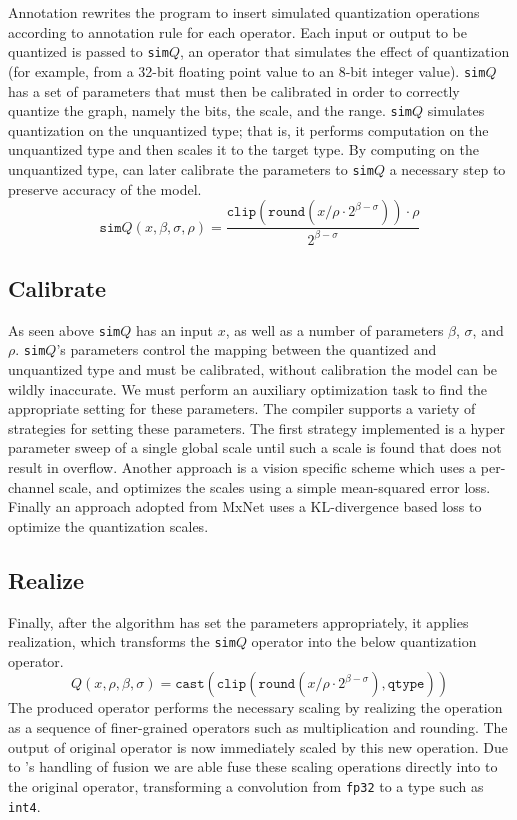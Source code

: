 Annotation rewrites the program to insert simulated quantization operations
  according to annotation rule for each operator.
Each input or output to be quantized is passed to \texttt{sim$Q$},
  an operator that simulates the effect of quantization (for example, from a 32-bit
  floating point value to an 8-bit integer value).
\texttt{sim$Q$} has a set of parameters that must then be calibrated in order to
  correctly quantize the graph, namely the bits, the scale, and the range.
\texttt{sim$Q$} simulates quantization on
  the unquantized type; that is, it performs computation on the unquantized type
  and then scales it to the target type.
By computing on the unquantized type, \relay can later calibrate the parameters to
  \texttt{sim$Q$} a necessary step to preserve accuracy of the model.
\[
  \texttt{sim$Q$}\left(x, \beta, \sigma, \rho\right) = \dfrac{\texttt{clip}\left(\texttt{round}\left(x / \rho \cdot 2^{\beta - \sigma}\right)\right) \cdot \rho}{2^{\beta - \sigma}}
\]
\subsection*{Calibrate}
As seen above \texttt{sim$Q$} has an input $x$, as well as a number of parameters
  $\beta$, $\sigma$, and $\rho$.
\texttt{sim$Q$}'s parameters control the mapping between the quantized and unquantized type
  and must be calibrated, without calibration the model can be wildly inaccurate.
We must perform an auxiliary optimization task to find the appropriate
  setting for these parameters.
The \relay compiler supports a variety of strategies for setting these
  parameters.
The first strategy implemented is a hyper parameter sweep of a
  single global scale until such a scale is found that does not result
  in overflow.
Another approach is a vision specific scheme which uses
  a per-channel scale, and optimizes the scales using a
  simple mean-squared error loss.
Finally an approach adopted from MxNet uses a
  KL-divergence based loss to optimize the
  quantization scales.

\subsection*{Realize}

Finally, after the algorithm has set the parameters appropriately,
  it applies realization,
  which transforms the \texttt{sim$Q$} operator into the below
  quantization operator.
\[
  Q\left(x, \rho, \beta, \sigma\right) = \texttt{cast}\left(\texttt{clip}\left(\texttt{round}\left(x / \rho \cdot 2^{\beta-\sigma}\right), \texttt{qtype}\right)\right)
\]
The produced operator performs the necessary scaling
  by realizing the operation as a sequence of finer-grained
  operators such as multiplication and rounding.
The output of original operator is now immediately scaled
  by this new operation.
Due to \relay's handling of fusion
  we are able fuse these scaling operations directly into
  to the original operator, transforming a convolution
  from \verb|fp32| to a type such as \verb|int4|.

